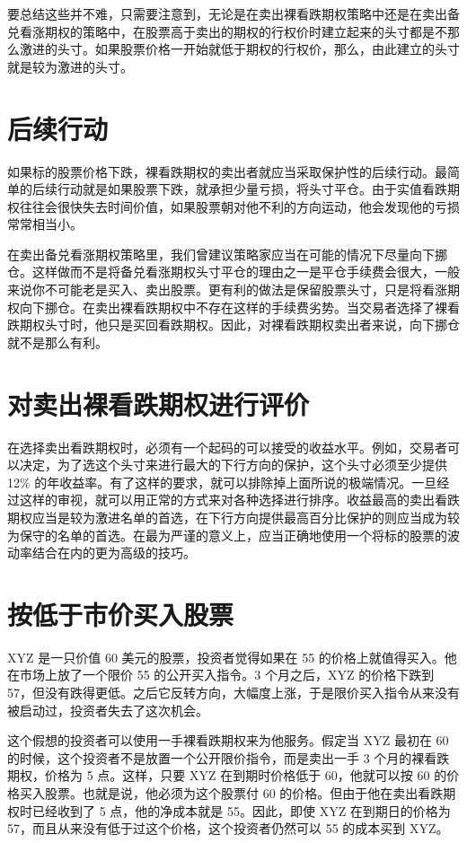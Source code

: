 要总结这些并不难，只需要注意到，无论是在卖出裸看跌期权策略中还是在卖出备兑看涨期权的策略中，在股票高于卖出的期权的行权价时建立起来的头寸都是不那么激进的头寸。如果股票价格一开始就低于期权的行权价，那么，由此建立的头寸就是较为激进的头寸。
\section{后续行动}
如果标的股票价格下跌，裸看跌期权的卖出者就应当采取保护性的后续行动。最简单的后续行动就是如果股票下跌，就承担少量亏损，将头寸平仓。由于实值看跌期权往往会很快失去时间价值，如果股票朝对他不利的方向运动，他会发现他的亏损常常相当小。

在卖出备兑看涨期权策略里，我们曾建议策略家应当在可能的情况下尽量向下挪仓。这样做而不是将备兑看涨期权头寸平仓的理由之一是平仓手续费会很大，一般来说你不可能老是买入、卖出股票。更有利的做法是保留股票头寸，只是将看涨期权向下挪仓。在卖出裸看跌期权中不存在这样的手续费劣势。当交易者选择了裸看跌期权头寸时，他只是买回看跌期权。因此，对裸看跌期权卖出者来说，向下挪仓就不是那么有利。
\section{对卖出裸看跌期权进行评价}
在选择卖出看跌期权时，必须有一个起码的可以接受的收益水平。例如，交易者可以决定，为了选这个头寸来进行最大的下行方向的保护，这个头寸必须至少提供 12\% 的年收益率。有了这样的要求，就可以排除掉上面所说的极端情况。一旦经过这样的审视，就可以用正常的方式来对各种选择进行排序。收益最高的卖出看跌期权应当是较为激进名单的首选，在下行方向提供最高百分比保护的则应当成为较为保守的名单的首选。在最为严谨的意义上，应当正确地使用一个将标的股票的波动率结合在内的更为高级的技巧。
\section{按低于市价买入股票}
\begin{tcolorbox}
    XYZ 是一只价值 60 美元的股票，投资者觉得如果在 55 的价格上就值得买入。他在市场上放了一个限价 55 的公开买入指令。3 个月之后，XYZ 的价格下跌到 57，但没有跌得更低。之后它反转方向，大幅度上涨，于是限价买入指令从来没有被启动过，投资者失去了这次机会。
\end{tcolorbox}
这个假想的投资者可以使用一手裸看跌期权来为他服务。假定当 XYZ 最初在 60 的时候，这个投资者不是放置一个公开限价指令，而是卖出一手 3 个月的裸看跌期权，价格为 5 点。这样，只要 XYZ 在到期时价格低于 60，他就可以按 60 的价格买入股票。也就是说，他必须为这个股票付 60 的价格。但由于他在卖出看跌期权时已经收到了 5 点，他的净成本就是 55。因此，即使 XYZ 在到期日的价格为 57，而且从来没有低于过这个价格，这个投资者仍然可以 55 的成本买到 XYZ。


